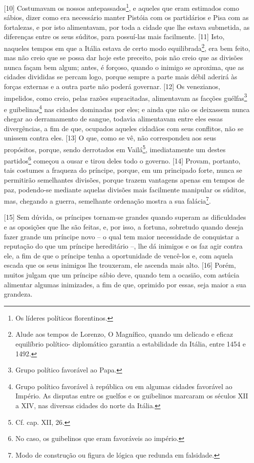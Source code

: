 {[}10{]} Costumavam os nossos antepassados\footnote{Os líderes políticos
  florentinos.}, e aqueles que eram estimados como sábios, dizer como
era necessário manter Pistóia com os partidários e Pisa com as
fortalezas, e por isto alimentavam, por toda a cidade que lhe estava
submetida, as diferenças entre os seus súditos, para possuí-las mais
facilmente. {[}11{]} Isto, naqueles tempos em que a Itália estava de
certo modo equilibrada\footnote{Alude aos tempos de Lorenzo, O
  Magnífico, quando um delicado e eficaz equilíbrio político-
  diplomático garantia a estabilidade da Itália, entre 1454 e 1492.},
era bem feito, mas não creio que se possa dar hoje este preceito, pois
não creio que as divisões nunca façam bem algum; antes, é forçoso,
quando o inimigo se aproxima, que as cidades divididas se percam logo,
porque sempre a parte mais débil aderirá às forças externas e a outra
parte não poderá governar. {[}12{]} Os venezianos, impelidos, como
creio, pelas razões supracitadas, alimentavam as facções
guélfas\footnote{Grupo político favorável ao Papa.} e
guibelinas\footnote{Grupo político favorável à república ou em algumas
  cidades favorável ao Império. As disputas entre os guelfos e os
  guibelinos marcaram os séculos XII a XIV, nas diversas cidades do
  norte da Itália.} nas cidades dominadas por eles; e ainda que não os
deixassem nunca chegar ao derramamento de sangue, todavia alimentavam
entre eles essas divergências, a fim de que, ocupados aqueles cidadãos
com seus conflitos, não se unissem contra eles. {[}13{]} O que, como se
vê, não correspondeu aos seus propósitos, porque, sendo derrotados em
Vailá\footnote{Cf. cap. XII, 26.}, imediatamente um destes
partidos\footnote{No caso, os guibelinos que eram favoráveis ao império.}
começou a ousar e tirou deles todo o governo. {[}14{]} Provam, portanto,
tais costumes a fraqueza do príncipe, porque, em um principado forte,
nunca se permitirão semelhantes divisões, porque trazem vantagens apenas
em tempos de paz, podendo-se mediante aquelas divisões mais facilmente
manipular os súditos, mas, chegando a guerra, semelhante ordenação
mostra a sua falácia\footnote{Modo de construção ou figura de lógica que
  redunda em falsidade.}.

{[}15{]} Sem dúvida, os príncipes tornam-se grandes quando superam as
dificuldades e as oposições que lhe são feitas, e, por isso, a fortuna,
sobretudo quando deseja fazer grande um príncipe novo -- o qual tem
maior necessidade de conquistar a reputação do que um príncipe
hereditário --, lhe dá inimigos e os faz agir contra ele, a fim de que o
príncipe tenha a oportunidade de vencê-los e, com aquela escada que os
seus inimigos lhe trouxeram, ele ascenda mais alto. {[}16{]} Porém,
muitos julgam que um príncipe sábio deve, quando tem a ocasião, com
astúcia alimentar algumas inimizades, a fim de que, oprimido por essas,
seja maior a sua grandeza.

